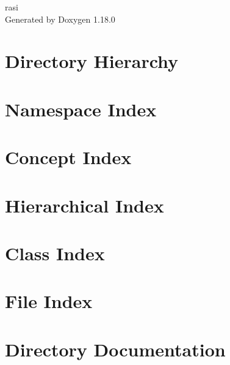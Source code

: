 \documentclass[twoside]{book}
\newcommand{\+}{\discretionary{\mbox{\scriptsize$\hookleftarrow$}}{}{}}
\newcommand{\clearemptydoublepage}{%
    \newpage{\pagestyle{empty}\cleardoublepage}%
  }
\begin{document}
  \raggedbottom
    \hypersetup{pageanchor=false,
                bookmarksnumbered=true,
                pdfencoding=unicode
               }
  \begin{titlepage}
  \vspace*{7cm}
  \begin{center}%
  {\Large rasi}\\
  \vspace*{1cm}
  {\large Generated by Doxygen 1.18.0}\\
  \end{center}
  \end{titlepage}
  \clearemptydoublepage
  \tableofcontents
  \clearemptydoublepage
  \hypersetup{pageanchor=true}
\chapter{Directory Hierarchy}

\chapter{Namespace Index}

\chapter{Concept Index}

\chapter{Hierarchical Index}

\chapter{Class Index}

\chapter{File Index}

\chapter{Directory Documentation}








\end{document}
